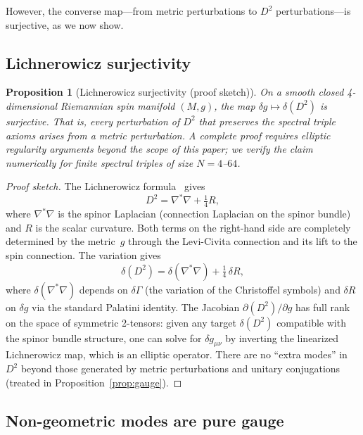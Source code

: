 \documentclass[12pt,a4paper]{article}
\newtheorem{proposition}[theorem]{Proposition}
\theoremstyle{definition}
\theoremstyle{remark}
\begin{document}
However, the converse map---from metric perturbations to $D^2$
perturbations---is surjective, as we now show.

\subsection{Lichnerowicz surjectivity}

\begin{proposition}[Lichnerowicz surjectivity (proof sketch)]
\label{prop:lichnerowicz}
On a smooth closed 4-dimensional Riemannian spin manifold $(M, g)$, the map
$\delta g \mapsto \delta(D^2)$ is surjective.  That is, every perturbation of
$D^2$ that preserves the spectral triple axioms arises from a metric
perturbation.  A complete proof requires elliptic regularity arguments beyond
the scope of this paper; we verify the claim numerically for finite spectral
triples of size $N = 4$--$64$.
\end{proposition}

\begin{proof}[Proof sketch]
The Lichnerowicz formula~\cite{Lichnerowicz:1963spinors} gives
\begin{equation}
  D^2 = \nabla^*\nabla + \tfrac{1}{4}R,
  \label{eq:lichnerowicz}
\end{equation}
where $\nabla^*\nabla$ is the spinor Laplacian (connection Laplacian on the
spinor bundle) and $R$ is the scalar curvature.  Both terms on the right-hand
side are completely determined by the metric~$g$ through the Levi-Civita
connection and its lift to the spin connection.  The variation gives
\begin{equation}
  \delta(D^2) = \delta(\nabla^*\nabla) + \tfrac{1}{4}\,\delta R,
\end{equation}
where $\delta(\nabla^*\nabla)$ depends on $\delta\Gamma$ (the variation of
the Christoffel symbols) and $\delta R$ on $\delta g$ via the standard
Palatini identity.  The Jacobian $\partial(D^2)/\partial g$ has full rank on
the space of symmetric 2-tensors: given any target $\delta(D^2)$ compatible
with the spinor bundle structure, one can solve for $\delta g_{\mu\nu}$ by
inverting the linearized Lichnerowicz map, which is an elliptic operator.
There are no ``extra modes'' in $D^2$ beyond those generated by metric
perturbations and unitary conjugations (treated in
Proposition~\ref{prop:gauge}).
\end{proof}

\subsection{Non-geometric modes are pure gauge}
\end{document}
